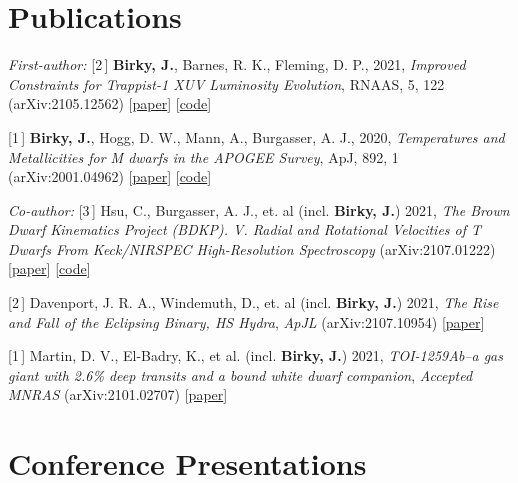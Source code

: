 \documentclass[margin,line]{resume}
\newcommand{\nlist}[1]{{\color{bcolor} [#1\,]}}
\begin{document}
\begin{resume}
\section{\mysidestyle \textcolor{bcolor}{Publications}}

\textsl{First-author:} \vspace{.2cm} \newline
\nlist{2} \textbf{Birky, J.}, Barnes, R. K., Fleming, D. P., 2021, \textsl{Improved Constraints for Trappist-1 XUV Luminosity Evolution}, RNAAS, 5, 122 (arXiv:2105.12562)  [\href{https://iopscience.iop.org/article/10.3847/2515-5172/ac034c}{paper}] [\href{https://github.com/jbirky/trappist_xuv}{code}]

\nlist{1} \textbf{Birky, J.}, Hogg, D. W., Mann, A., Burgasser, A. J., 2020, \textsl{Temperatures and Metallicities for M dwarfs in the APOGEE Survey}, ApJ, 892, 1 (arXiv:2001.04962) [\href{https://iopscience.iop.org/article/10.3847/1538-4357/ab7004}{paper}] [\href{https://github.com/jbirky/Mdwarf_project}{code}]

\textsl{Co-author:} \vspace{.2cm} \newline
\nlist{3} Hsu, C., Burgasser, A. J., et. al (incl. \textbf{Birky, J.}) 2021, \textsl{The Brown Dwarf Kinematics Project (BDKP). V. Radial and Rotational Velocities of T Dwarfs From Keck/NIRSPEC High-Resolution Spectroscopy} (arXiv:2107.01222) [\href{https://arxiv.org/abs/2107.01222}{paper}] [\href{https://github.com/chihchunhsu/smart}{code}]

\nlist{2} Davenport, J. R. A., Windemuth, D., et. al (incl. \textbf{Birky, J.}) 2021, \textsl{The Rise and Fall of the Eclipsing Binary, HS Hydra}, \textit{ApJL} (arXiv:2107.10954) [\href{https://arxiv.org/abs/2107.10954}{paper}]

\nlist{1} Martin, D. V., El-Badry, K., et al. (incl. \textbf{Birky, J.}) 2021, \textsl{TOI-1259Ab--a gas giant with 2.6\% deep transits and a bound white dwarf companion}, \textit{Accepted MNRAS} (arXiv:2101.02707) [\href{https://arxiv.org/abs/2101.02707}{paper}]

\newpage


\section{\mysidestyle \textcolor{bcolor}{Conference Presentations}}


\end{resume}
\end{document}
